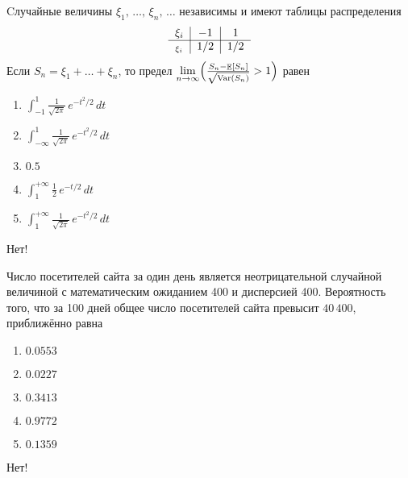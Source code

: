 \documentclass[t]{beamer}
\DeclareMathOperator{\Var}{Var}
\DeclareMathOperator{\E}{\mathbb{E}}
\let\P\relax
\DeclareMathOperator{\P}{\mathbb{P}}
\begin{document}
 \begin{frame} \label{17-No} 
\begin{block}{17} 

    Cлучайные величины $\xi_1, \, \ldots, \, \xi_n, \, \ldots$ независимы и имеют таблицы распределения
    \[
    \begin{tabular}{c|c|c}
      $\xi_i$                     & $-1$   & $1$   \\ \cline{1-3}
      $\P_{\xi_i}$        & $1/2$       & $1/2$   \\
    \end{tabular}
    \]
    Если $S_n = \xi_1 + \ldots + \xi_n$, то предел $\lim\limits_{n \rightarrow \infty}\P\Bigl(\frac{S_n - \E[S_n]}{\sqrt{\Var(S_n)}} > 1\Bigr)$ равен
  


 \end{block} 
\begin{enumerate} 
\item[] \hyperlink{17-No}{\beamergotobutton{} $\int_{-1}^{1}\frac{1}{\sqrt{2\pi}}\,e^{-t^2/2}\,dt$}
\item[] \hyperlink{17-No}{\beamergotobutton{} $\int_{-\infty}^{1}\frac{1}{\sqrt{2\pi}}\,e^{-t^2/2}\,dt$}
\item[] \hyperlink{17-No}{\beamergotobutton{} $0.5$}
\item[] \hyperlink{17-No}{\beamergotobutton{} $\int_{1}^{+\infty}\frac{1}{2}\,e^{-t/2}\,dt$}
\item[] \hyperlink{17-Yes}{\beamergotobutton{} $\int_{1}^{+\infty}\frac{1}{\sqrt{2\pi}}\,e^{-t^2/2}\,dt$}
\end{enumerate} 

 \alert{Нет!} 
\end{frame} 


 \begin{frame} \label{18-No} 
\begin{block}{18} 

  Число посетителей сайта за один день является неотрицательной случайной величиной с математическим ожиданием 400 и дисперсией 400. Вероятность того, что за 100 дней общее число посетителей сайта превысит $40\,400$, приближённо равна
  


 \end{block} 
\begin{enumerate} 
\item[] \hyperlink{18-No}{\beamergotobutton{} $0.0553$}
\item[] \hyperlink{18-Yes}{\beamergotobutton{} $0.0227$}
\item[] \hyperlink{18-No}{\beamergotobutton{} $0.3413$}
\item[] \hyperlink{18-No}{\beamergotobutton{} $0.9772$}
\item[] \hyperlink{18-No}{\beamergotobutton{} $0.1359$}
\end{enumerate} 

 \alert{Нет!} 
\end{frame} 
\end{document}
